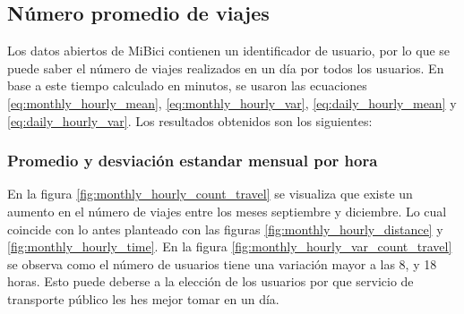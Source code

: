 \subsection{Número promedio de viajes}

Los datos abiertos de MiBici contienen un identificador de usuario, por lo que se puede saber el número de viajes realizados en un día por todos los usuarios. En base a este tiempo calculado en minutos, se usaron las ecuaciones \ref{eq:monthly_hourly_mean}, \ref{eq:monthly_hourly_var}, \ref{eq:daily_hourly_mean} y \ref{eq:daily_hourly_var}. Los resultados obtenidos son los siguientes:

\subsubsection{Promedio y desviación estandar mensual por hora}

En la figura \ref{fig:monthly_hourly_count_travel} se visualiza que existe un aumento en el número de viajes entre los meses septiembre y diciembre. Lo cual coincide con lo antes planteado con las figuras \ref{fig:monthly_hourly_distance} y \ref{fig:monthly_hourly_time}. En la figura \ref{fig:monthly_hourly_var_count_travel} se observa como el número de usuarios tiene una variación mayor a las 8, y 18 horas. Esto puede deberse a la elección de los usuarios por que servicio de transporte público les hes mejor tomar en un día.

